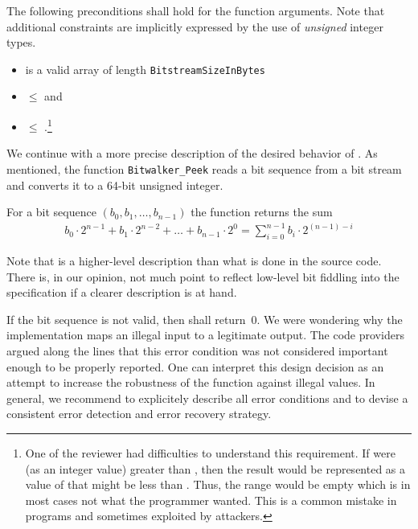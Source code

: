 The following preconditions shall hold for the function arguments.
Note that additional constraints are implicitly expressed by the use
of \emph{unsigned} integer types.

\begin{itemize}
\item {} is a valid array of length \verb"BitstreamSizeInBytes"

\item {} $\leq$  and

\item {} $\leq$ .\footnote{%
      One of the reviewer had difficulties to understand this requirement.
      If  were (as an integer value) greater
      than , then the result would be represented as a value of
       that might be less than .
      Thus, the range  would be
      empty which is in most cases not what the programmer wanted.
      This is a common mistake in programs and sometimes exploited by attackers.
}
\end{itemize}

We continue with a more precise description of the desired behavior of \peek.
As mentioned, the function \texttt{Bitwalker\_Peek} reads a bit sequence from a bit stream
and converts it to a 64-bit unsigned integer.

For a bit sequence $(b_0, b_1,\ldots,b_{n - 1})$ the function \peek returns the sum
\begin{align}
    b_0 \cdot 2^{n - 1} + b_1\cdot 2^{n - 2} + \ldots + b_{n-1}\cdot 2^0
    =
    \sum_{i=0}^{n-1} b_i \cdot 2^{(n - 1) - i} 
\end{align}

Note that is a higher-level description than what is done in the source code.
There is, in our opinion, not much point to reflect low-level bit fiddling
into the specification if a clearer description is at hand.

If the bit sequence is not valid, then \peek shall return~0.
We were wondering why the implementation maps an illegal input to a legitimate output.
The code providers argued along the lines that this error condition was not
considered important enough to be properly reported.
One can interpret this design decision as an attempt to increase the
robustness of the function against illegal values.
In general, we recommend to explicitely describe all error conditions
and to devise a consistent error detection and error recovery strategy.


